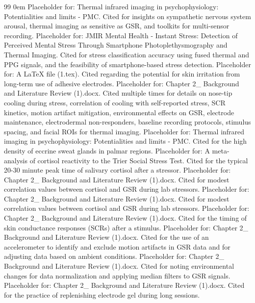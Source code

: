 \documentclass{article}
\begin{document}
    \begin{thebibliography}{99}
        \itemsep0em
         Placeholder for: Thermal infrared imaging in psychophysiology: Potentialities and limits - PMC. Cited for insights on sympathetic nervous system arousal, thermal imaging as sensitive as GSR, and toolkits for multi-sensor recording.
         Placeholder for: JMIR Mental Health - Instant Stress: Detection of Perceived Mental Stress Through Smartphone Photoplethysmography and Thermal Imaging. Cited for stress classification accuracy using fused thermal and PPG signals, and the feasibility of smartphone-based stress detection.
         Placeholder for: A LaTeX file (1.tex). Cited regarding the potential for skin irritation from long-term use of adhesive electrodes.
         Placeholder for: Chapter 2\_ Background and Literature Review (1).docx. Cited multiple times for details on nose-tip cooling during stress, correlation of cooling with self-reported stress, SCR kinetics, motion artifact mitigation, environmental effects on GSR, electrode maintenance, electrodermal non-responders, baseline recording protocols, stimulus spacing, and facial ROIs for thermal imaging.
         Placeholder for: Thermal infrared imaging in psychophysiology: Potentialities and limits - PMC. Cited for the high density of eccrine sweat glands in palmar regions.
         Placeholder for: A meta-analysis of cortisol reactivity to the Trier Social Stress Test. Cited for the typical 20-30 minute peak time of salivary cortisol after a stressor.
         Placeholder for: Chapter 2\_ Background and Literature Review (1).docx. Cited for modest correlation values between cortisol and GSR during lab stressors.
         Placeholder for: Chapter 2\_ Background and Literature Review (1).docx. Cited for modest correlation values between cortisol and GSR during lab stressors.
         Placeholder for: Chapter 2\_ Background and Literature Review (1).docx. Cited for the timing of skin conductance responses (SCRs) after a stimulus.
         Placeholder for: Chapter 2\_ Background and Literature Review (1).docx. Cited for the use of an accelerometer to identify and exclude motion artifacts in GSR data and for adjusting data based on ambient conditions.
         Placeholder for: Chapter 2\_ Background and Literature Review (1).docx. Cited for noting environmental changes for data normalization and applying median filters to GSR signals.
         Placeholder for: Chapter 2\_ Background and Literature Review (1).docx. Cited for the practice of replenishing electrode gel during long sessions.

\end{thebibliography}
\end{document}
